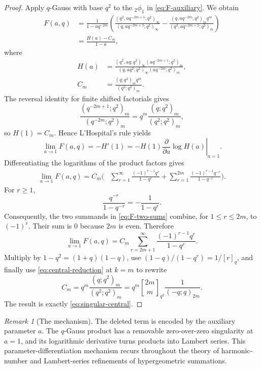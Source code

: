 \documentclass[11pt,oneside,openany]{book}
\theoremstyle{definition}
\theoremstyle{remark}
\newtheorem{remark}[theorem]{Remark}
\newcommand{\Qbinom}[3]{\genfrac{[}{]}{0pt}{}{#1}{#2}_{#3}}
\begin{document}
\begin{proof}
Apply $q$-Gauss with base $q^2$ to the ${}_2\phi_1$ in \eqref{eq:F-auxiliary}.  We obtain
\begin{align*}
 F(a,q)
 &=\frac1{1-aq^{-2m}}
 \left(
 \frac{(q^2,aq^{-2m+1};q^2)_\infty}
 {(q,aq^{-2m+2};q^2)_\infty}
 -\frac{(q,aq^{-2m};q^2)_m q^m}
 {(q^2,aq^{-2m+2};q^2)_m}
 \right)\\
 &=\frac{H(a)-C_m}{1-a},
 \tag{18.10}\label{eq:F-H}
\end{align*}
where
\begin{align*}
 H(a)&=
 \frac{(q^2,aq;q^2)_\infty(aq^{-2m+1};q^2)_m}
 {(q,aq^2;q^2)_\infty(aq^{-2m};q^2)_m},\\
 C_m&=\frac{(q;q^2)_m q^m}{(q^2;q^2)_m}.
\end{align*}
The reversal identity for finite shifted factorials gives
\[
 \frac{(q^{-2m+1};q^2)_m}{(q^{-2m};q^2)_m}
 =q^m\frac{(q;q^2)_m}{(q^2;q^2)_m},
\]
so $H(1)=C_m$.  Hence L'Hospital's rule yields
\[
 \lim_{a\to1}F(a,q)=-H'(1)
 =-H(1)\left.\frac{\partial}{\partial a}\log H(a)\right|_{a=1}.
 \tag{18.11}\label{eq:F-logderivative}
\]
Differentiating the logarithms of the product factors gives
\begin{align*}
 \lim_{a\to1}F(a,q)
 =C_m\biggl(&
 \sum_{r=1}^{\infty}
 \frac{(-1)^{r-1}q^r}{1-q^r}
 +\sum_{r=1}^{2m}
 \frac{(-1)^{r-1}q^{-r}}{1-q^{-r}}
 \biggr).
 \tag{18.12}\label{eq:F-two-sums}
\end{align*}
For $r\ge1$,
\[
 \frac{q^{-r}}{1-q^{-r}}=-\frac1{1-q^r}.
\]
Consequently, the two summands in \eqref{eq:F-two-sums} combine, for $1\le r\le2m$, to $(-1)^r$.  Their sum is $0$ because $2m$ is even.  Therefore
\[
 \lim_{a\to1}F(a,q)
 =C_m\sum_{r=2m+1}^{\infty}
 \frac{(-1)^{r-1}q^r}{1-q^r}.
 \tag{18.13}\label{eq:F-tail}
\]
Multiply by $1-q^2=(1+q)(1-q)$, use
$(1-q)/(1-q^r)=1/[r]_q$, and finally use \eqref{eq:central-reduction} at $k=m$ to rewrite
\[
 C_m=q^m\frac{(q;q^2)_m}{(q^2;q^2)_m}
 =q^m\Qbinom{2m}{m}{q^2}\frac1{(-q;q)_{2m}}.
\]
The result is exactly \eqref{eq:singular-central}.
\end{proof}

\begin{remark}[The mechanism]
The deleted term is encoded by the auxiliary parameter $a$.  The $q$-Gauss product has a removable zero-over-zero singularity at $a=1$, and its logarithmic derivative turns products into Lambert series.  This parameter-differentiation mechanism recurs throughout the theory of harmonic-number and Lambert-series refinements of hypergeometric summations.
\end{remark}
\end{document}
